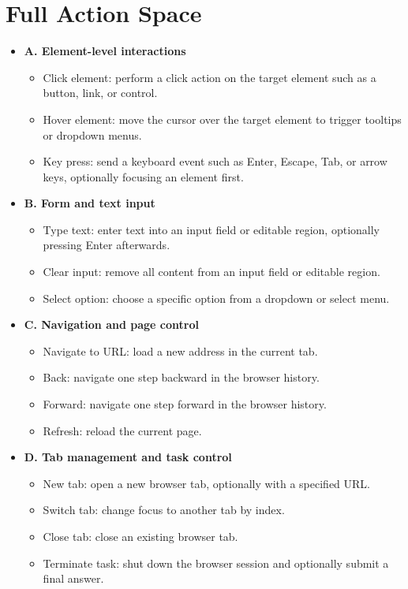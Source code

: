 \documentclass[manuscript,review,anonymous]{acmart}
\begin{document}
\section{Full Action Space}
\label{sec:full-action-space}
\begin{itemize}[leftmargin=*]

\item {\textbf{A. Element-level interactions}}
  \begin{itemize}[leftmargin=*]
    \item {Click element}: perform a click action on the target element such as a button, link, or control.  
    \item {Hover element}: move the cursor over the target element to trigger tooltips or dropdown menus.  
    \item {Key press}: send a keyboard event such as Enter, Escape, Tab, or arrow keys, optionally focusing an element first.  
  \end{itemize}

\item {\textbf{B. Form and text input}}
  \begin{itemize}[leftmargin=*]
    \item {Type text}: enter text into an input field or editable region, optionally pressing Enter afterwards.  
    \item {Clear input}: remove all content from an input field or editable region.  
    \item {Select option}: choose a specific option from a dropdown or select menu.  
  \end{itemize}

\item {\textbf{C. Navigation and page control}}
  \begin{itemize}[leftmargin=*]
    \item {Navigate to URL}: load a new address in the current tab.  
    \item {Back}: navigate one step backward in the browser history.  
    \item {Forward}: navigate one step forward in the browser history.  
    \item {Refresh}: reload the current page.  
  \end{itemize}

\item {\textbf{D. Tab management and task control}}
  \begin{itemize}[leftmargin=*]
    \item {New tab}: open a new browser tab, optionally with a specified URL.  
    \item {Switch tab}: change focus to another tab by index.  
    \item {Close tab}: close an existing browser tab.  
    \item {Terminate task}: shut down the browser session and optionally submit a final answer.
  \end{itemize}

\end{itemize}
\end{document}
